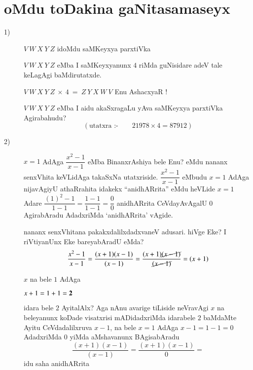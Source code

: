 \chapter{oMdu toDakina gaNitasamaseyx}

\begin{description}
\item[{\rm 1)}] $V ~W ~X ~Y ~Z$ idoMdu saMKeyxya parxtiVka

  $V ~W ~X ~Y ~Z$ eMba I saMKeyxyanunx $4$ riMda guNisidare adeV tale keLagAgi baMdirutatxde.

  $V ~W ~X ~Y ~Z ~ \times ~4 ~= ~Z ~Y~X~W~V$ Enu AshacxyaR !

  $V ~W ~X ~Y ~Z$ eMba I aidu akaSxragaLu yAva saMKeyxya parxtiVka Agirabahudu?
  $$
\left(\text{utatxra :-}\qquad  21978 \times 4 = 87912 \right)
  $$
  
\item[{\rm 2)}] $x=1$ AdAga $\dfrac{x^2-1}{x-1}$ eMba BinanxrAshiya bele Enu? eMdu nananx senxVhita keVLidAga takaSxNa utatxriside. $\dfrac{x^2-1}{x-1}$ eMbudu $x=1$ AdAga nijavAgiyU athaRrahita idakekx ``anidhARrita'' eMdu heVLide $x=1$ Adare $\dfrac{(1)^2 -1}{1-1} = \dfrac{1-1}{1-1} = \dfrac{0}{0}$ anidhARrita CeVdayAvAgalU $0$ AgirabAradu AdadxriMda `anidhARrita' vAgide.


  nananx senxVhitana pakakxdalilxdadxvaneV adusari. hiVge Eke? I riVtiyanUnx Eke bareyabAradU eMda?
  $$
  \frac{x^2-1}{x-1} = \frac{(x+1)(x-1)}{(x-1)} = \frac{(x+1)\cancel{(x-1)}}{\cancel{(x-1)}} = (x+1)
  $$

\eject

  $x$ na bele $1$ AdAga
  
  $x+1 =1+1 ={\bf 2}$ 
  
  idara bele $2$ AyitalAlx? Aga nAnu avarige tiLiside  neVravAgi $x$ na beleyanunx koDade visatxrisi mADidadxriMda idarabele  $2$ baMdaMte Ayitu CeVdadalilxruva $x-1$, na bele $x=1$ AdAga $x-1=1-1=0$ AdadxriMda $0$ yiMda aMshavanunx BAgisabAradu
  $$
  \dfrac{(x+1)(x-1)}{(x-1)} = \dfrac{(x+1)(x-1)}{0} =
  $$
  idu saha anidhARrita
\end{description}

